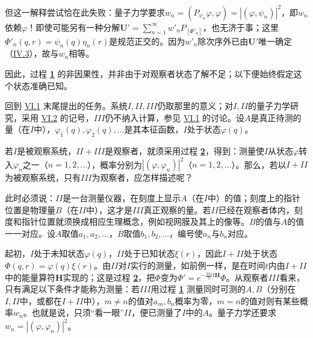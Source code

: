 \documentclass[fontsize=13pt,twoside,openany,headings=normal,parskip=false,bookmarkpackage=false,DIV=calc]{scrbook}
\begin{document}
但这一解释尝试恰在此失败：量子力学要求$w_n=(P_{\psi_n}\varphi,\allowbreak \varphi)=|(\varphi,\allowbreak \psi_n)|^2$，即$w_n$依赖$\varphi$！即使可能另有一种分解$\boldsymbol U'=\sum_{n=1}^{\infty}w'_nP_{[\Phi'_n]}$，也无济于事；这里$\Phi'_n(q,\allowbreak r)=\psi_n(q)\eta_n(r)$是规范正交的。因为$w'_n$除次序外已由$\boldsymbol U'$唯一确定（\hyperref[sec:IV.3]{IV.3}），故与$w_n$相等。

因此，过程 \hyperref[eq:V.1.1]{\textbf{1}} 的非因果性，并非由于对观察者状态了解不足；以下便始终假定这个状态准确已知。

\hypertarget{origpage-234}{}\label{origpage-234}回到 \hyperref[sec:VI.1]{VI.1} 末尾提出的任务。系统$I,\allowbreak II,\allowbreak III$仍取那里的意义；对$I,\allowbreak II$的量子力学研究，采用 \hyperref[sec:VI.2]{VI.2} 的记号，$III$仍不纳入计算，参见 \hyperref[sec:VI.1]{VI.1} 的讨论。设$A$是真正待测的量（在$I$中），$\varphi_1(q),\allowbreak \varphi_2(q),\allowbreak \ldots$是其本征函数，$I$处于状态$\varphi(q)$。

若$I$是被观察系统，$II+III$是观察者，就须采用过程 \hyperref[eq:V.1.2]{\textbf{2}}，得到：测量使$I$从状态$\varphi$转入$\varphi_n$之一（$n=1,\allowbreak 2,\allowbreak \ldots$），概率分别为$|(\varphi,\allowbreak \varphi_n)|^2$（$n=1,\allowbreak 2,\allowbreak \ldots$）。那么，若以$I+II$为被观察系统，只有$III$为观察者，应怎样描述呢？

此时必须说：$II$是一台测量仪器，在刻度上显示$A$（在$I$中）的值；刻度上的指针位置是物理量$B$（在$II$中），这才是$III$真正观察的量。若$II$已经在观察者体内，刻度和指针位置就须换成相应生理概念，例如视网膜及其上的像等。$B$的值与$A$的值一一对应。设$A$取值$a_1,\allowbreak a_2,\allowbreak \ldots$，$B$取值$b_1,\allowbreak b_2,\allowbreak \ldots$，编号使$a_n$与$b_n$对应。

起初，$I$处于未知状态$\varphi(q)$，$II$处于已知状态$\xi(r)$，因此$I+II$处于状态$\Phi(q,\allowbreak r)=\varphi(q)\xi(r)$。由$II$对$I$实行的测量，如前例一样，是在时间$t$内由$I+II$中的能量算符$\boldsymbol H$实现的；这是过程 \hyperref[eq:V.1.2]{\textbf{2}}，把$\Phi$变为$\Phi'=e^{-\frac{2\pi i}{h}t\boldsymbol H}\Phi$。从观察者$III$看来，只有满足以下条件才能称为测量：若$III$用过程 \hyperref[eq:V.1.1]{\textbf{1}} 测量同时可测的$A,\allowbreak B$（分别在$I,\allowbreak II$中，或都在$I+II$中），$m\ne n$的值对$a_m,\allowbreak b_n$概率为零，$m=n$的值对则有某些概率$w_n$。也就是说，只须“看一眼”$II$，便已测量了$I$中的$A$。量子力学还要求$w_n=|(\varphi,\allowbreak \varphi_n)|^2$。
\end{document}
